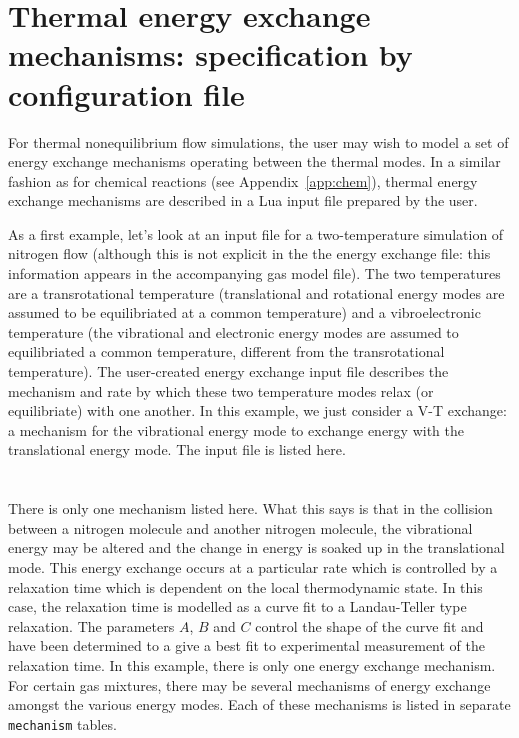 \section{Thermal energy exchange mechanisms: specification by configuration file}
\label{app:therm-exchange}
For thermal nonequilibrium flow simulations, the user may wish to model a set of 
energy exchange mechanisms operating between the thermal modes.
In a similar fashion as for chemical reactions (see Appendix~\ref{app:chem}), 
thermal energy exchange mechanisms are described in a Lua input file prepared by
the user.

As a first example, let's look at an input file for a two-temperature
simulation of nitrogen flow (although this is not explicit in the
the energy exchange file: this information appears in the accompanying
gas model file).
The two temperatures are a transrotational temperature (translational and
rotational energy modes are assumed to be equilibriated at a common temperature)
and a vibroelectronic temperature (the vibrational and electronic energy modes
are assumed to equilibriated a common temperature, different from the transrotational
temperature).
The user-created energy exchange input file describes the mechanism and rate
by which these two temperature modes relax (or equilibriate) with one another.
In this example, we just consider a V-T exchange: a mechanism for the vibrational
energy mode to exchange energy with the translational energy mode.
The input file is listed here.\\
\topbar\\

\bottombar\\
There is only one mechanism listed here.
What this says is that in the collision between a nitrogen molecule
and another nitrogen molecule, the vibrational energy may be altered and
the change in energy is soaked up in the translational mode.
This energy exchange occurs at a particular rate which is controlled
by a relaxation time which is dependent on the local thermodynamic state.
In this case, the relaxation time is modelled as a curve fit to a
Landau-Teller type relaxation.
The parameters $A$, $B$ and $C$ control the shape of the curve fit and
have been determined to a give a best fit to experimental measurement
of the relaxation time.
In this example, there is only one energy exchange mechanism.
For certain gas mixtures, there may be several mechanisms of energy exchange
amongst the various energy modes.
Each of these mechanisms is listed in separate \texttt{mechanism} tables.


